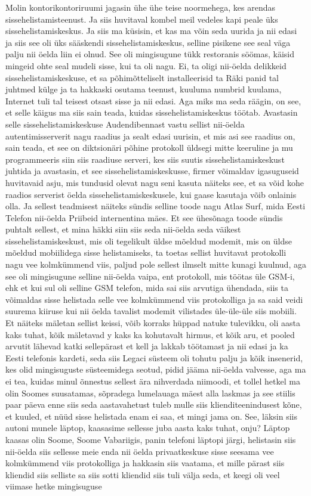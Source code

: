 Molin kontorikontoriruumi jagasin ühe ühe teise noormehega, kes arendas sissehelistamisteenust. Ja siis huvitaval kombel meil vedeles kapi peale üks sissehelistamiskeskus. Ja siis ma küsisin, et kas ma võin seda uurida ja nii edasi ja siis see oli üks sääskendi sissehelistamiskeskus, selline pisikene see seal väga palju nii öelda liin ei olnud.
See oli mingisugune tükk restoranis söömas, käisid mingeid ohte seal mudeli sisse, kui ta oli nagu.
Ei, ta oligi nii-öelda delikkeid sissehelistamiskeskuse, et sa põhimõtteliselt installeerisid ta Räki panid tal juhtmed külge ja ta hakkaski osutama teenust, kuuluma numbrid kuulama, Internet tuli tal teisest otsast sisse ja nii edasi. Aga miks ma seda räägin, on see, et selle käigus ma siis sain teada, kuidas sissehelistamiskeskus töötab. Avastasin selle sissehelistamiskeskuse Audendibennast vastu sellist nii-öelda autentimisserverit nagu raadius ja sealt edasi uurisin, et mis asi see raadius on, sain teada, et see on diktsionäri põhine protokoll üldsegi mitte keeruline ja mu programmeeris siin siis raadiuse serveri, kes siis suutis sissehelistamiskeskust juhtida ja avastasin, et see sissehelistamiskeskusse, firmer võimaldav igasuguseid huvitavaid asju, mis tundusid olevat nagu seni kasuta näiteks see, et sa võid kohe raadios serverist öelda sissehelistamiskeskusele, kui gaase kasutaja võib onlainis olla. Ja sellest teadmisest näiteks sündis selline toode nagu Atlas Surf, mida Eesti Telefon nii-öelda Priibeid internentina mäes. Et see ühesõnaga toode sündis puhtalt sellest, et mina häkki siin siis seda nii-öelda seda väikest sissehelistamiskeskust, mis oli tegelikult üldse mõeldud modemit, mis on üldse mõeldud mobiilidega sisse helistamiseks, ta toetas sellist huvitavat protokolli nagu vee kolmkümmend viis, paljud pole sellest ilmselt mitte kunagi kuulnud, aga see oli mingisugune selline nii-öelda vaipa, ent protokoll, mis töötas üle GSM-i, ehk et kui sul oli selline GSM telefon, mida sai siis arvutiga ühendada, siis ta võimaldas sisse helistada selle vee kolmkümmend viis protokolliga ja sa said veidi suurema kiiruse kui nii öelda tavalist modemit vilistades üle-üle-üle siis mobiili. Et näiteks mäletan sellist keissi, võib korraks hüppad natuke tulevikku, oli aasta kaks tuhat, kõik mäletavad y kaks ka kohutavalt hirmus, et kõik aru, et pooled arvutit lähevad katki sellepärast et kell ja lakkab töötamast ja nii edasi ja ka Eesti telefonis kardeti, seda siis Legaci süsteem oli tohutu palju ja kõik insenerid, kes olid mingisuguste süsteemidega seotud, pidid jääma nii-öelda valvesse, aga ma ei tea, kuidas minul õnnestus sellest ära nihverdada niimoodi, et tollel hetkel ma olin Soomes suusatamas, sõpradega lumelauaga mäest alla laskmas ja see stiilis paar päeva enne siis seda aastavahetust tuleb mulle siis klienditeenindusest kõne, et kuuled, et nüüd sisse helistada enam ei saa, et mingi jama on. See, läksin siis autoni munele läptop, kaasasime sellesse juba aasta kaks tuhat, onju? Läptop kaasas olin Soome, Soome Vabariigis, panin telefoni läptopi järgi, helistasin siis nii-öelda siis sellesse meie enda nii öelda privaatkeskuse sisse seesama vee kolmkümmend viis protokolliga ja hakkasin siis vaatama, et mille pärast siis kliendid siis selliste sa siis sotti kliendid siis tuli välja seda, et keegi oli veel viimase hetke mingisuguse 